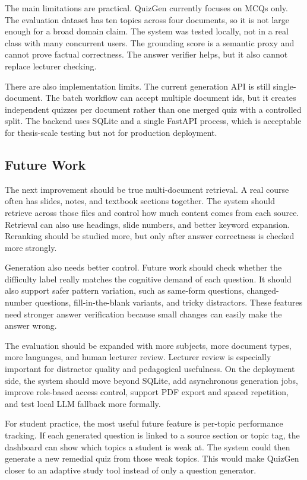 \documentclass[12pt,a4paper]{article}
\begin{document}
The main limitations are practical. QuizGen currently focuses on MCQs only.
The evaluation dataset has ten topics across four documents, so it is not
large enough for a broad domain claim. The system was tested locally, not in
a real class with many concurrent users. The grounding score is a semantic
proxy and cannot prove factual correctness. The answer verifier helps, but
it also cannot replace lecturer checking.

There are also implementation limits. The current generation API is still
single-document. The batch workflow can accept multiple document ids, but it
creates independent quizzes per document rather than one merged quiz with a
controlled split. The backend uses SQLite and a single FastAPI process,
which is acceptable for thesis-scale testing but not for production
deployment.

\subsection{Future Work}
\label{subsec:future}

The next improvement should be true multi-document retrieval. A real course
often has slides, notes, and textbook sections together. The system should
retrieve across those files and control how much content comes from each
source. Retrieval can also use headings, slide numbers, and better keyword
expansion. Reranking should be studied more, but only after answer
correctness is checked more strongly.

Generation also needs better control. Future work should check whether the
difficulty label really matches the cognitive demand of each question. It
should also support safer pattern variation, such as same-form questions,
changed-number questions, fill-in-the-blank variants, and tricky
distractors. These features need stronger answer verification because small
changes can easily make the answer wrong.

The evaluation should be expanded with more subjects, more document types,
more languages, and human lecturer review. Lecturer review is especially
important for distractor quality and pedagogical usefulness. On the
deployment side, the system should move beyond SQLite, add asynchronous
generation jobs, improve role-based access control, support PDF export and
spaced repetition, and test local LLM fallback more formally.

For student practice, the most useful future feature is per-topic
performance tracking. If each generated question is linked to a source
section or topic tag, the dashboard can show which topics a student is weak
at. The system could then generate a new remedial quiz from those weak
topics. This would make QuizGen closer to an adaptive study tool instead of
only a question generator.
\end{document}
